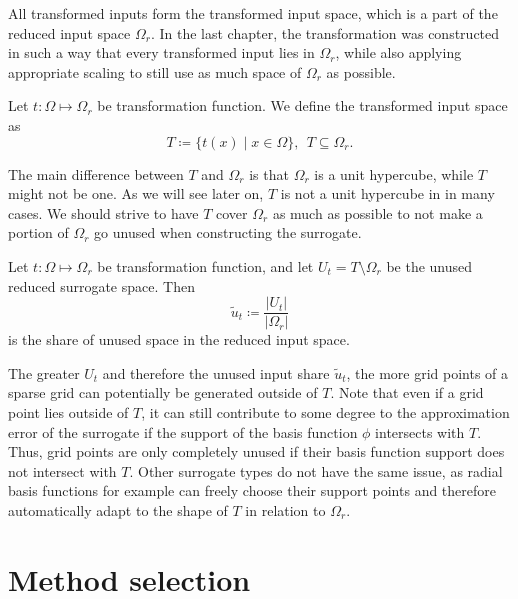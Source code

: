 \documentclass[
  a4paper,  %
  twoside,  %
  bibliography=totoc,
  headsepline,
  cleardoublepage=empty,
  parskip=half,
  draft=false
]{scrbook}
\begin{document}
All transformed inputs form the transformed input space, which is a part of the reduced input space $\Omega_r$.
In the last chapter, the transformation was constructed in such a way that every transformed input lies in $\Omega_r$, while also applying appropriate scaling to still use as much space of $\Omega_r$ as possible.

\begin{definition}
Let $t \colon \Omega \mapsto \Omega_r$ be transformation function.
We define the transformed input space as
\begin{equation}
T \coloneqq \{t(x) \mid x \in\Omega\}, ~~ T \subseteq \Omega_r.
\end{equation}
\end{definition}
%
The main difference between $T$ and $\Omega_r$ is that $\Omega_r$ is a unit hypercube, while $T$ might not be one.
As we will see later on, $T$ is not a unit hypercube in in many cases.
We should strive to have $T$ cover $\Omega_r$ as much as possible to not make a portion of $\Omega_r$ go unused when constructing the surrogate.

\begin{definition}
Let $t \colon \Omega \mapsto \Omega_r$ be transformation function, and let $U_t=T \setminus \Omega_r$ be the unused reduced surrogate space.
Then
\begin{equation}
\tilde{u}_t \coloneqq \frac{|U_t|}{|\Omega_r|}
\end{equation}
is the share of unused space in the reduced input space.
\end{definition}
%
The greater $U_t$ and therefore the unused input share $\tilde{u}_t$, the more grid points of a sparse grid can potentially be generated outside of $T$.
Note that even if a grid point lies outside of $T$, it can still contribute to some degree to the approximation error of the surrogate if the support of the basis function $\phi$ intersects with $T$.
Thus, grid points are only completely unused if their basis function support does not intersect with $T$.
Other surrogate types do not have the same issue, as radial basis functions for example can freely choose their support points and therefore automatically adapt to the shape of $T$ in relation to $\Omega_r$.

\section{Method selection}
\label{sec:ms}
\end{document}
